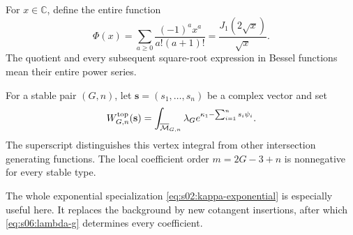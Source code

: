 \documentclass[a4paper,10pt]{article}
\numberwithin{equation}{section}
\newcommand{\MM}{\overline{\mathcal{M}}}
\theoremstyle{paperplain}
\theoremstyle{paperremark}
\theoremstyle{paperplain}
\begin{document}
For $x\in\mathbb C$, define the entire function
\begin{equation}\label{eq:s06:phi}
 \Phi(x)=\sum_{a\geq0}\frac{(-1)^a x^a}{a!(a+1)!}
        =\frac{J_1(2\sqrt x)}{\sqrt x}.
\end{equation}
The quotient and every subsequent square-root expression in Bessel
functions mean their entire power series.

For a stable pair $(G,n)$, let $\mathbf s=(s_1,\ldots,s_n)$
be a complex vector and set
\begin{equation}\label{eq:s06:vertex-definition}
 W^{\rm top}_{G,n}(\mathbf s)
  =\int_{\MM_{G,n}}\lambda_G
                   e^{\kappa_1-\sum_{i=1}^n s_i\psi_i}.
\end{equation}
The superscript distinguishes this vertex integral from other
intersection generating functions. The local coefficient order
$m=2G-3+n$ is nonnegative for every stable type.

The whole exponential specialization
\eqref{eq:s02:kappa-exponential} is especially useful here. It
replaces the background by new cotangent insertions, after which
\eqref{eq:s06:lambda-g} determines every coefficient.
\end{document}
